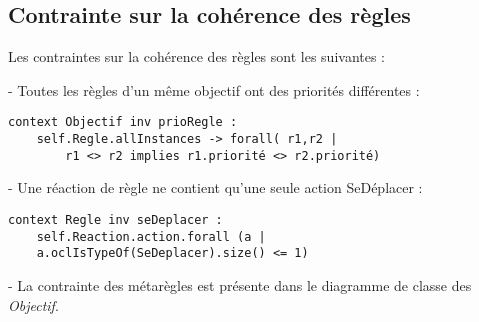 
\subsection{Contrainte sur la cohérence des règles}
\label{sec:question20}

Les contraintes sur la cohérence des règles sont les suivantes :

- Toutes les règles d'un même objectif ont des priorités différentes :

\begin{lstlisting}[caption=Contrainte sur les priorités,captionpos=b,label={lst:règles},language=OCL]
context Objectif inv prioRegle :
    self.Regle.allInstances -> forall( r1,r2 |
        r1 <> r2 implies r1.priorité <> r2.priorité)
\end{lstlisting}

- Une réaction de règle ne contient qu'une seule action SeDéplacer :

\begin{lstlisting}[caption=Contrainte sur SeDéplacer,captionpos=b,label={lst:SeDéplacer},language=OCL]
context Regle inv seDeplacer :
    self.Reaction.action.forall (a | 
    a.oclIsTypeOf(SeDeplacer).size() <= 1)
\end{lstlisting}

- La contrainte des métarègles est présente dans le diagramme de classe des \emph{Objectif}.
